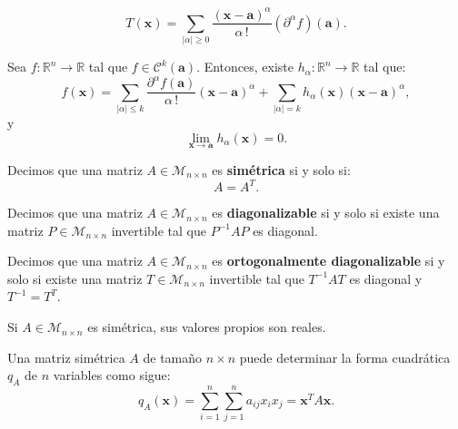 \documentclass[8pt,a4paper]{extarticle}
\begin{document}
\begin{multicols}{3}
\begin{boxdef}
	\[
		T(\mathbf{x}) = \sum_{|\alpha| \ge 0} \frac{(\mathbf{x} - \mathbf{a})^\alpha}{\alpha\,!} \left(\partial^\alpha f \right)(\mathbf{a})
	.\] 
\end{boxdef}

\begin{boxtheo}[de Taylor]
	Sea $f : \mathbb{R}^n \to \mathbb{R}$ tal que $f \in \mathcal{C}^k(\mathbf{a})$. Entonces, existe $h_{\alpha} : \mathbb{R}^n \to \mathbb{R}$ tal que:
	\[
		f(\mathbf{x}) = \sum_{|\alpha| \le k} \frac{\partial^\alpha f(\mathbf{a})}{\alpha\,!} (\mathbf{x} - \mathbf{a})^\alpha + \sum_{|\alpha| = k} h_{\alpha}(\mathbf{x})(\mathbf{x} - \mathbf{a})^\alpha
	,\] 
	y
	\[
		\lim_{\mathbf{x} \to \mathbf{a}} h_{\alpha} (\mathbf{x}) = 0
	.\] 
\end{boxtheo}

\begin{boxdef}
	Decimos que una matriz $A \in \mathcal{M}_{n \times n}$ es \textbf{simétrica} si y solo si:
	\[
	A = A^T
	.\] 
\end{boxdef}

\begin{boxdef}
	Decimos que una matriz $A \in \mathcal{M}_{n \times n}$ es \textbf{diagonalizable} si y solo si existe una matriz $P  \in \mathcal{M}_{n \times n}$ invertible tal que $P^{-1}AP$ es diagonal.
\end{boxdef}

\begin{boxdef}
	Decimos que una matriz $A \in \mathcal{M}_{n \times n}$ es \textbf{ortogonalmente diagonalizable} si y solo si existe una matriz $T  \in \mathcal{M}_{n \times n}$ invertible tal que $T^{-1}AT$ es diagonal y $T^{-1} = T^T$.
\end{boxdef}

\begin{boxtheo}[]
	Si $A \in \mathcal{M}_{n \times n}$ es simétrica, sus valores propios son reales.
\end{boxtheo}

\begin{boxtheo}[]
	Una matriz simétrica $A$ de tamaño $n \times n$ puede determinar la forma cuadrática $q_A$ de $n$ variables como sigue:
	\[
		q_A (\mathbf{x}) = \sum_{i = 1}^n \sum_{j = 1}^n a_{ij}x_ix_j = \mathbf{x}^T A \mathbf{x}
	.\] 
\end{boxtheo}


\end{multicols}
\end{document}
